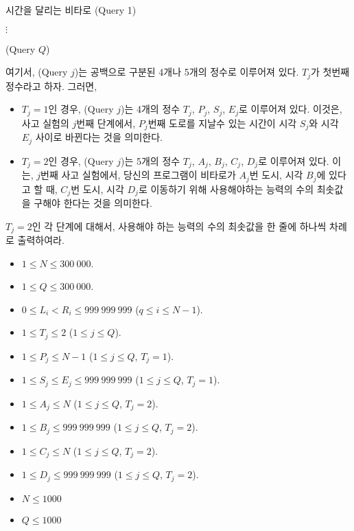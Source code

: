 \begin{problem}{시간을 달리는 비타로}
	(Query 1)
	
	$\vdots$
	
	(Query $Q$)
	
	여기서, (Query $j$)는 공백으로 구분된 4개나 5개의 정수로 이루어져 있다. $T_j$가 첫번째 정수라고 하자. 그러면,
	
	\begin{itemize}
		\item $T_j=1$인 경우, (Query $j$)는 4개의 정수 $T_j$, $P_j$, $S_j$, $E_j$로 이루어져 있다. 이것은, 사고 실험의 $j$번째 단계에서, $P_j$번째 도로를 지날수 있는 시간이 시각 $S_j$와 시각 $E_j$ 사이로 바뀐다는 것을 의미한다.
		\item $T_j=2$인 경우, (Query $j$)는 5개의 정수 $T_j$, $A_j$, $B_j$, $C_j$, $D_j$로 이루어져 있다. 이는, $j$번째 사고 실험에서, 당신의 프로그램이 비타로가 $A_j$번 도시, 시각 $B_j$에 있다고 할 때, $C_j$번 도시, 시각 $D_j$로 이동하기 위해 사용해야하는 능력의 수의 최솟값을 구해야 한다는 것을 의미한다.
	\end{itemize}
	
	\OutputFile
	
	$T_j=2$인 각 단계에 대해서, 사용해야 하는 능력의 수의 최솟값을 한 줄에 하나씩 차례로 출력하여라.
	
	\Constraints
	
	\begin{itemize}
		
		\item $1 \le N \le 300\ 000$.
		\item $1 \le Q \le 300\ 000$.
		\item $0 \le L_i < R_i \le 999\ 999\ 999$ ($q \le i \le N-1$).
		\item $1 \le T_j \le 2$ ($1 \le j \le Q$).
		\item $1 \le P_j \le N-1$ ($1 \le j \le Q$, $T_j = 1$).
		\item $1 \le S_j \le E_j \le 999\ 999\ 999$ ($1 \le j \le Q$, $T_j = 1$).
		\item $1 \le A_j \le N$ ($1 \le j \le Q$, $T_j = 2$).
		\item $1 \le B_j \le 999\ 999\ 999$ ($1 \le j \le Q$, $T_j = 2$).
		\item $1 \le C_j \le N$ ($1 \le j \le Q$, $T_j = 2$).
		\item $1 \le D_j \le 999\ 999\ 999$ ($1 \le j \le Q$, $T_j = 2$).
		
	\end{itemize}
	
	
	\begin{itemize}
		\item $N \le 1000$
		\item $Q \le 1000$
	\end{itemize}
	

\end{problem}
